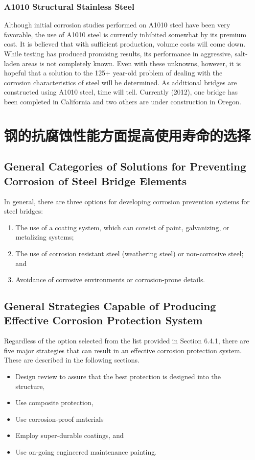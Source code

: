 \subsubsection{A1010 Structural Stainless Steel}
Although initial corrosion studies performed on A1010 steel have been very favorable, the use of A1010 steel is
currently inhibited somewhat by its premium cost. It is believed that with sufficient production, volume costs will
come down. While testing has produced promising results, its performance in aggressive, salt-laden areas is not
completely known. Even with these unknowns, however, it is hopeful that a solution to the 125+ year-old problem of
dealing with the corrosion characteristics of steel will be determined. As additional bridges are constructed using
A1010 steel, time will tell. Currently (2012), one bridge has been completed in California and two others are under
construction in Oregon.

\section{钢的抗腐蚀性能方面提高使用寿命的选择}

\subsection{General Categories of Solutions for Preventing Corrosion of Steel Bridge Elements}
In general, there are three options for developing corrosion prevention systems for steel bridges:
\begin{enumerate}
  \item The use of a coating system, which can consist of paint, galvanizing, or metalizing systems;
  \item The use of corrosion resistant steel (weathering steel) or non-corrosive steel; and
  \item Avoidance of corrosive environments or corrosion-prone details.
\end{enumerate}
\subsection{General Strategies Capable of Producing Effective Corrosion Protection System}
Regardless of the option selected from the list provided in Section 6.4.1, there are five major strategies that can
result in an effective corrosion protection system. These are described in the following sections.
\begin{itemize}
  \item Design review to assure that the best protection is designed into the structure,
  \item Use composite protection,
  \item Use corrosion-proof materials
  \item Employ super-durable coatings, and
  \item Use on-going engineered maintenance painting.
\end{itemize}
